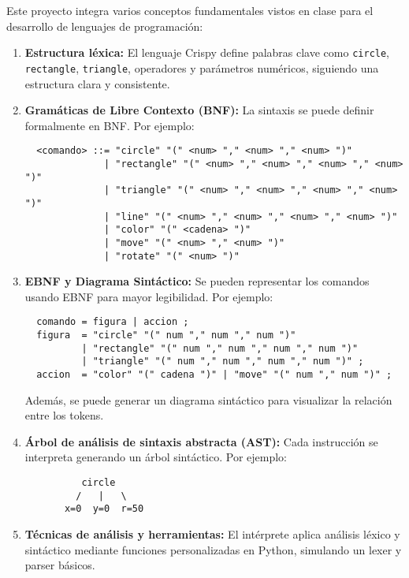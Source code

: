 \documentclass[12pt]{article}
\begin{document}
Este proyecto integra varios conceptos fundamentales vistos en clase para el desarrollo de lenguajes de programación:

\begin{enumerate}
  \item \textbf{Estructura léxica:} El lenguaje Crispy define palabras clave como \texttt{circle}, \texttt{rectangle}, \texttt{triangle}, operadores y parámetros numéricos, siguiendo una estructura clara y consistente.

  \item \textbf{Gramáticas de Libre Contexto (BNF):} La sintaxis se puede definir formalmente en BNF. Por ejemplo:
  
  \begin{verbatim}
  <comando> ::= "circle" "(" <num> "," <num> "," <num> ")"
              | "rectangle" "(" <num> "," <num> "," <num> "," <num> ")"
              | "triangle" "(" <num> "," <num> "," <num> "," <num> ")"
              | "line" "(" <num> "," <num> "," <num> "," <num> ")"
              | "color" "(" <cadena> ")"
              | "move" "(" <num> "," <num> ")"
              | "rotate" "(" <num> ")"
  \end{verbatim}

  \item \textbf{EBNF y Diagrama Sintáctico:} Se pueden representar los comandos usando EBNF para mayor legibilidad. Por ejemplo:
  \begin{verbatim}
  comando = figura | accion ;
  figura  = "circle" "(" num "," num "," num ")"
          | "rectangle" "(" num "," num "," num "," num ")"
          | "triangle" "(" num "," num "," num "," num ")" ;
  accion  = "color" "(" cadena ")" | "move" "(" num "," num ")" ;
  \end{verbatim}

  Además, se puede generar un diagrama sintáctico para visualizar la relación entre los tokens.

  \item \textbf{Árbol de análisis de sintaxis abstracta (AST):} Cada instrucción se interpreta generando un árbol sintáctico. Por ejemplo:
  
  \begin{verbatim}
          circle
         /   |   \
       x=0  y=0  r=50
  \end{verbatim}

  \item \textbf{Técnicas de análisis y herramientas:} El intérprete aplica análisis léxico y sintáctico mediante funciones personalizadas en Python, simulando un lexer y parser básicos.


\end{enumerate}
\end{document}
